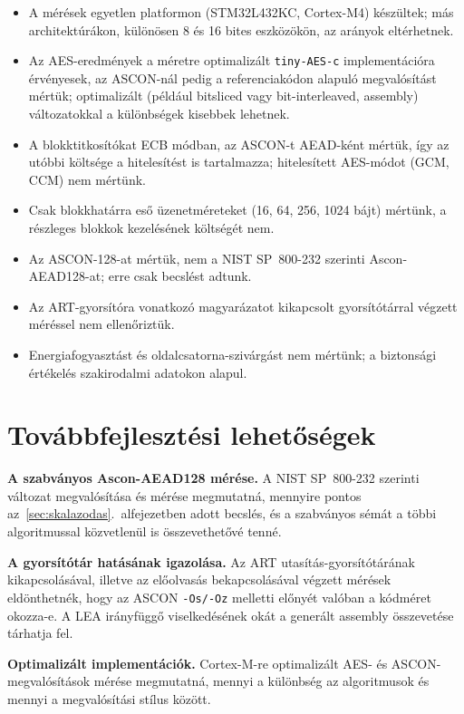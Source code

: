 \documentclass[a4paper,12pt]{report}
\theoremstyle{definition}
\theoremstyle{remark}
\begin{document}
\begin{itemize}
	\item A mérések egyetlen platformon (STM32L432KC, Cortex-M4) készültek; más architektúrákon, különösen 8 és 16 bites eszközökön, az arányok eltérhetnek.
	\item Az AES-eredmények a méretre optimalizált \texttt{tiny-AES-c} implementációra érvényesek, az ASCON-nál pedig a referenciakódon alapuló megvalósítást mértük; optimalizált (például bitsliced vagy bit-interleaved, assembly) változatokkal a különbségek kisebbek lehetnek.
	\item A blokktitkosítókat ECB módban, az ASCON-t AEAD-ként mértük, így az utóbbi költsége a hitelesítést is tartalmazza; hitelesített AES-módot (GCM, CCM) nem mértünk.
	\item Csak blokkhatárra eső üzenetméreteket (16, 64, 256, 1024 bájt) mértünk, a részleges blokkok kezelésének költségét nem.
	\item Az ASCON-128-at mértük, nem a NIST SP~800-232 szerinti Ascon-AEAD128-at; erre csak becslést adtunk.
	\item Az ART-gyorsítóra vonatkozó magyarázatot kikapcsolt gyorsítótárral végzett méréssel nem ellenőriztük.
	\item Energiafogyasztást és oldalcsatorna-szivárgást nem mértünk; a biztonsági értékelés szakirodalmi adatokon alapul.
\end{itemize}

\section{Továbbfejlesztési lehetőségek}\label{sec:tovabbfejlesztes}

\textbf{A szabványos Ascon-AEAD128 mérése.} A NIST SP~800-232 szerinti változat megvalósítása és mérése megmutatná, mennyire pontos az~\ref{sec:skalazodas}.~alfejezetben adott becslés, és a szabványos sémát a többi algoritmussal közvetlenül is összevethetővé tenné.

\textbf{A gyorsítótár hatásának igazolása.} Az ART utasítás-gyorsítótárának kikapcsolásával, illetve az előolvasás bekapcsolásával végzett mérések eldönthetnék, hogy az ASCON \texttt{-Os/-Oz} melletti előnyét valóban a kódméret okozza-e. A LEA irányfüggő viselkedésének okát a generált assembly összevetése tárhatja fel.

\textbf{Optimalizált implementációk.} Cortex-M-re optimalizált AES- és ASCON-megvalósítások mérése megmutatná, mennyi a különbség az algoritmusok és mennyi a megvalósítási stílus között.
\end{document}

